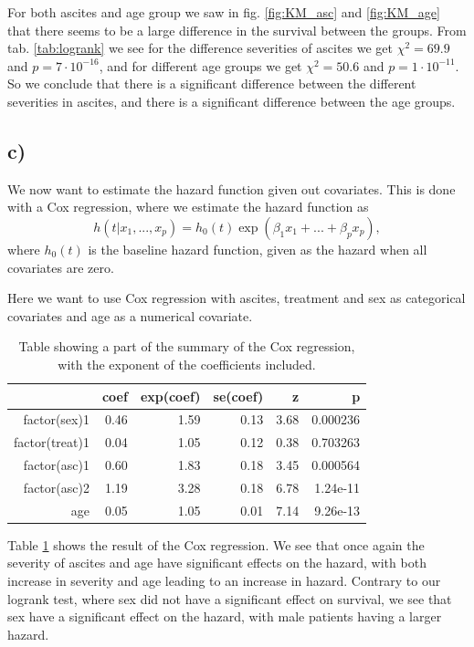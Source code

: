 \documentclass[a4paper,norsk, 10pt]{article}
\begin{document}
For both ascites and age group we saw in fig. \ref{fig:KM_asc} and \ref{fig:KM_age} that there seems to be a large difference in the survival between the groups. From tab. \ref{tab:logrank} we see for the difference severities of ascites we get $\chi^2 = 69.9$ and $p=7\cdot10^{-16}$, and for different age groups we get $\chi^2 = 50.6$ and $p=1\cdot10^{-11}$. So we conclude that there is a significant difference between the different severities in ascites, and there is a significant difference between the age groups.


\subsection{c)}
We now want to estimate the hazard function given out covariates. This is done with a Cox regression, where we estimate the hazard function as
\begin{equation}
h(t|x_1,...,x_p) = h_0(t)\exp(\beta_1 x_1 + ... + \beta_p x_p),
\end{equation}
where $h_0(t)$ is the baseline hazard function, given as the hazard when all covariates are zero.

Here we want to use Cox regression with ascites, treatment and sex as categorical covariates and age as a numerical covariate.


\begin{table}[!htb]
\centering
\begin{tabular}{rrrrrr}
  \hline
 & coef & exp(coef) & se(coef) & z & p \\ 
  \hline
factor(sex)1 & 0.46 & 1.59 & 0.13 & 3.68 & 0.000236 \\ 
  factor(treat)1 & 0.04 & 1.05 & 0.12 & 0.38 & 0.703263 \\ 
  factor(asc)1 & 0.60 & 1.83 & 0.18 & 3.45 & 0.000564 \\ 
  factor(asc)2 & 1.19 & 3.28 & 0.18 & 6.78 & 1.24e-11 \\ 
  age & 0.05 & 1.05 & 0.01 & 7.14 & 9.26e-13 \\ 
   \hline
\end{tabular}
\caption{Table showing a part of the summary of the Cox regression, with the exponent of the coefficients included.}\label{tab:cox}
\end{table}

Table \ref{tab:cox} shows the result of the Cox regression. We see that once again the severity of ascites and age have significant effects on the hazard, with both increase in severity and age leading to an increase in hazard. Contrary to our logrank test, where sex did not have a significant effect on survival, we see that sex have a significant effect on the hazard, with male patients having a larger hazard.
\end{document}
